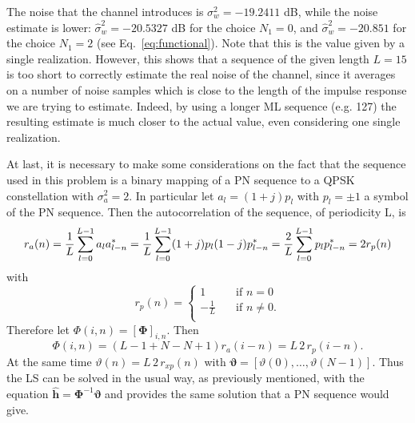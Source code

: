 \documentclass[10pt]{article}
\begin{document}
The noise that the channel introduces is $\sigma_w^2 = -19.2411$ dB, while the noise estimate is lower: $\hat{\sigma}_w^2 = -20.5327$ dB for the choice $N_1 = 0$, and $\hat{\sigma}_w^2 = -20.851$ for the choice $N_1 = 2$ (see Eq.~\ref{eq:functional}). Note that this is the value given by a single realization. However, this shows that a sequence of the given length $L = 15$ is too short to correctly estimate the real noise of the channel, since it averages on a number of noise samples which is close to the length of the impulse response we are trying to estimate. Indeed, by using a longer ML sequence (e.g. 127) the resulting estimate is much closer to the actual value, even considering one single realization. 

At last, it is necessary to make some considerations on the fact that the sequence used in this problem is a binary mapping of a PN sequence to a QPSK constellation with $\sigma_a^2 = 2$. In particular let $a_l = (1+j) p_l$ with $p_l = \pm 1$ a symbol of the PN sequence. Then the autocorrelation of the sequence, of periodicity L, is
\begin{equation}
	r_a(n) = \frac{1}{L}\sum_{l = 0}^{L-1} a_l a^*_{l-n} = \\
	\frac{1}{L}\sum_{l = 0}^{L-1} (1+j)p_l (1-j)p^*_{l-n} = 
	\frac{2}{L} \sum_{l= 0}^{L-1} p_l p^*_{l-n} = 2 r_p(n)
\end{equation}
with 
\begin{equation}
	r_p(n) = 
  	\begin{cases}
    1       & \quad \text{if } n =0 \\
    -\frac{1}{L}  & \quad \text{if } n \neq 0. \\
  \end{cases}
\end{equation}
Therefore let $\Phi(i, n) = [\mathbf{\Phi}]_{i, n}$. Then
\begin{equation}
	\Phi(i, n) = (L -1 + N - N + 1)r_a(i-n) = L \, 2 \, r_p(i-n).
\end{equation}
At the same time $\vartheta(n) = L \, 2 \, r_{xp}(n)$ with $\boldsymbol{\vartheta} = [\vartheta(0), \dots, \vartheta(N-1)]$.
Thus the LS can be solved in the usual way, as previously mentioned, with the equation $\hat{\mathbf{h}}= \mathbf{\Phi}^{-1} \boldsymbol{\vartheta}$ and provides the same solution that a PN sequence would give. 
\end{document}

